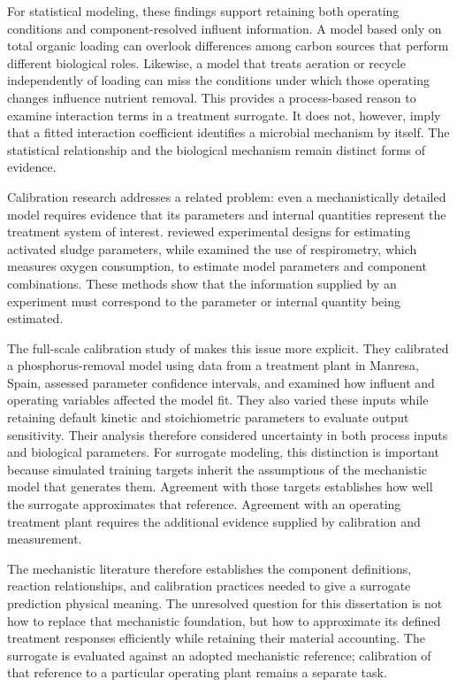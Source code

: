 For statistical modeling, these findings support retaining both operating conditions and component-resolved influent information. A model based only on total organic loading can overlook differences among carbon sources that perform different biological roles. Likewise, a model that treats aeration or recycle independently of loading can miss the conditions under which those operating changes influence nutrient removal. This provides a process-based reason to examine interaction terms in a treatment surrogate. It does not, however, imply that a fitted interaction coefficient identifies a microbial mechanism by itself. The statistical relationship and the biological mechanism remain distinct forms of evidence.

Calibration research addresses a related problem: even a mechanistically detailed model requires evidence that its parameters and internal quantities represent the treatment system of interest. \citet{Petersen2003} reviewed experimental designs for estimating activated sludge parameters, while \citet{Vanrolleghem1999} examined the use of respirometry, which measures oxygen consumption, to estimate model parameters and component combinations. These methods show that the information supplied by an experiment must correspond to the parameter or internal quantity being estimated.

The full-scale calibration study of \citet{Machado2014} makes this issue more explicit. They calibrated a phosphorus-removal model using data from a treatment plant in Manresa, Spain, assessed parameter confidence intervals, and examined how influent and operating variables affected the model fit. They also varied these inputs while retaining default kinetic and stoichiometric parameters to evaluate output sensitivity. Their analysis therefore considered uncertainty in both process inputs and biological parameters. For surrogate modeling, this distinction is important because simulated training targets inherit the assumptions of the mechanistic model that generates them. Agreement with those targets establishes how well the surrogate approximates that reference. Agreement with an operating treatment plant requires the additional evidence supplied by calibration and measurement.

The mechanistic literature therefore establishes the component definitions, reaction relationships, and calibration practices needed to give a surrogate prediction physical meaning. The unresolved question for this dissertation is not how to replace that mechanistic foundation, but how to approximate its defined treatment responses efficiently while retaining their material accounting. The surrogate is evaluated against an adopted mechanistic reference; calibration of that reference to a particular operating plant remains a separate task.

